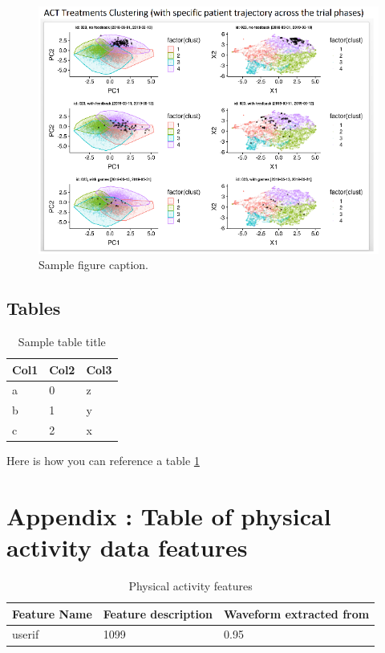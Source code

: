 \documentclass{article}
\begin{document}
\begin{figure}
  \centering
  \caption{Sample figure caption.}
  \includegraphics[]{sample_fig}
\end{figure}

\subsection{Tables}
\begin{table}
  \caption{Sample table title}
  \label{sample_table}
  \centering
  \begin{tabular}{lll}
    \toprule
    \cmidrule(r){1-2}
    Col1 & Col2 & Col3 \\
    \midrule
    a & 0 & z\\
    b & 1 & y \\
    c & 2 & x \\
    \bottomrule
  \end{tabular}
\end{table}

Here is how you can reference a table \ref{sample_table}




\appendix
\section{Appendix : Table of physical activity data features}

\begin{table}[h]
  \caption{Physical activity features}
  \label{fitbit_features}
  \centering
  \begin{tabular}{ |l|l|l| }
    \toprule
    \cmidrule(r){1-2}
    Feature Name & Feature description & Waveform extracted from \\
    \midrule
    userif & 1099 & 0.95 \\
    \bottomrule
    \end{tabular}
\end{table}
\end{document}

